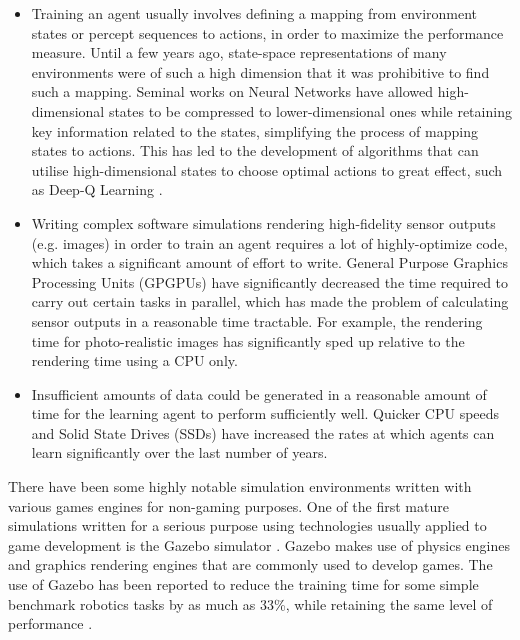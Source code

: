 \begin{itemize}
    \item
    Training an agent usually involves defining a mapping from environment states or percept sequences to actions, in order to maximize the performance measure. Until a few years ago, state-space representations of many environments were of such a high dimension that it was prohibitive to find such a mapping. Seminal works on Neural Networks \cite{Lecun1998Gradient-BasedRecognition} \cite{Krizhevsky2012ImageNetNetworks} have allowed high-dimensional states to be compressed to lower-dimensional ones while retaining key information related to the states, simplifying the process of mapping states to actions. This has led to the development of algorithms that can utilise high-dimensional states to choose optimal actions to great effect, such as Deep-Q Learning \cite{Mnih2013PlayingLearning}.
    \item Writing complex software simulations rendering high-fidelity sensor outputs (e.g. images) in order to train an agent requires a lot of highly-optimize code, which takes a significant amount of effort to write.
    General Purpose Graphics Processing Units (GPGPUs) have significantly decreased the time required to carry out certain tasks in parallel, which has made the problem of calculating sensor outputs in a reasonable time tractable. For example, the rendering time for photo-realistic images has significantly sped up relative to the rendering time using a CPU only. 
    \item Insufficient amounts of data could be generated in a reasonable amount of time for the learning agent to perform sufficiently well. Quicker CPU speeds and Solid State Drives (SSDs) have increased the rates at which agents can learn significantly over the last number of years.
\end{itemize}

There have been some highly notable simulation environments written with various games engines for non-gaming purposes. One of the first mature simulations written for a serious purpose using technologies usually applied to game development is the Gazebo simulator \cite{Koenig2005DesignSimulator}. Gazebo makes use of physics engines and graphics rendering engines that are commonly used to develop games. The use of Gazebo has been reported to reduce the training time for some simple benchmark robotics tasks by as much as 33\%, while retaining the same level of performance \cite{VilchesRobotGazebo}. 

